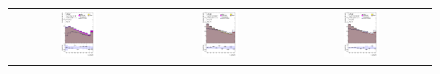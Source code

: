%
\begin{figure}[H]
\centering
\begin{tabular}{@{}ccc@{}}
\includegraphics[page=1,width=0.28\textwidth]{figures/pt/tuH_reg1l2tau1bnj_os_log_.pdf} &
\includegraphics[page=1,width=0.28\textwidth]{figures/pt/tuH_reg1l1tau1b1j_ss_log_.pdf}&
\includegraphics[page=1,width=0.28\textwidth]{figures/pt/tuH_reg1l1tau1b2j_ss_log_.pdf}\\

\end{tabular}
\end{figure}
